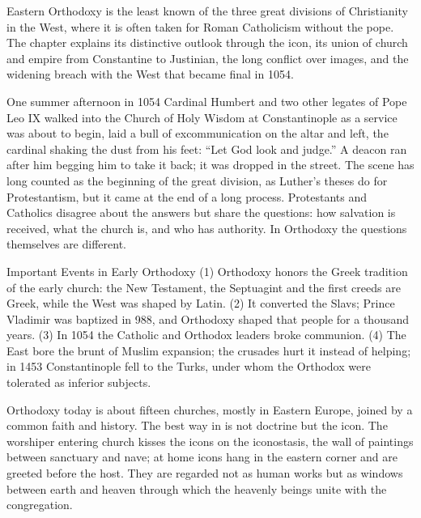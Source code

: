 
\begin{inbrief}
Eastern Orthodoxy is the least known of the three great divisions of Christianity in the West, where
it is often taken for Roman Catholicism without the pope. The chapter explains its distinctive outlook
through the icon, its union of church and empire from Constantine to Justinian, the long conflict over
images, and the widening breach with the West that became final in 1054.
\end{inbrief}

One summer afternoon in 1054 Cardinal Humbert and two other legates of Pope Leo IX walked into the
Church of Holy Wisdom at Constantinople as a service was about to begin, laid a bull of
excommunication on the altar and left, the cardinal shaking the dust from his feet: ``Let God look and
judge.'' A deacon ran after him begging him to take it back; it was dropped in the street. The scene
has long counted as the beginning of the great division, as Luther's theses do for Protestantism, but
it came at the end of a long process. Protestants and Catholics disagree about the answers but share the questions: how salvation is received, what the church is, and who has authority. In Orthodoxy the
questions themselves are different.

\begin{sidebox}{Important Events in Early Orthodoxy}
(1) Orthodoxy honors the Greek tradition of the early church: the New Testament, the Septuagint and
the first creeds are Greek, while the West was shaped by Latin. (2) It converted the Slavs; Prince
Vladimir was baptized in 988, and Orthodoxy shaped that people for a thousand years. (3) In 1054 the
Catholic and Orthodox leaders broke communion. (4) The East bore the brunt of Muslim expansion; the
crusades hurt it instead of helping; in 1453 Constantinople fell to the Turks, under whom the Orthodox
were tolerated as inferior subjects.
\end{sidebox}

Orthodoxy today is about fifteen churches, mostly in Eastern Europe, joined by a common faith and
history. The best way in is not doctrine but the icon. The worshiper entering church kisses the icons
on the iconostasis, the wall of paintings between sanctuary and nave; at home icons hang in the
eastern corner and are greeted before the host. They are regarded not as human works but as windows
between earth and heaven through which the heavenly beings unite with the congregation.


